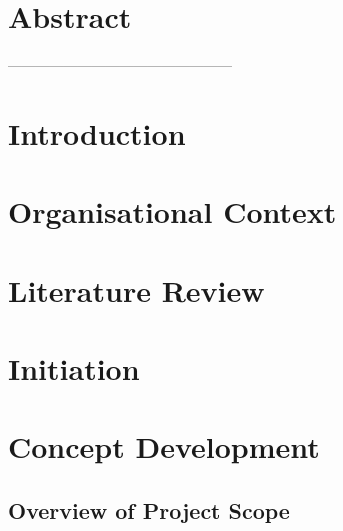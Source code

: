 \documentclass[a4paper]{article}
\begin{document}
\section*{Abstract}

\pagebreak
\tableofcontents
\pagebreak------------------------------------------------
\section{Introduction}

\section{Organisational Context}

\section {Literature Review}


\section {Initiation}


\section {Concept Development}


\subsection {Overview of Project Scope}
\end{document}
